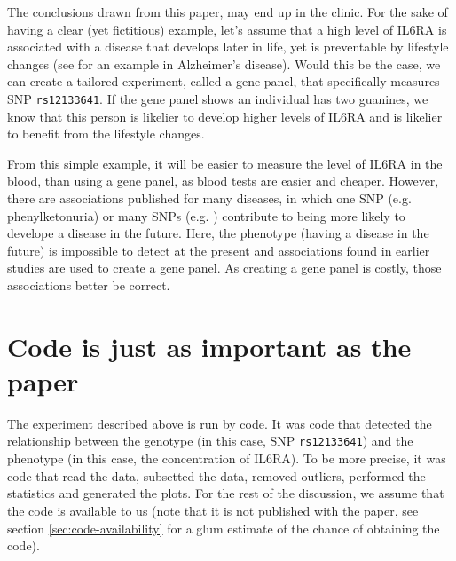 The conclusions drawn from this paper,
may end up in the clinic.
For the sake of having a clear (yet fictitious) example,
let's assume that a high level of IL6RA 
is associated with a disease that develops later in life,
yet is preventable by lifestyle 
changes (see \cite{pope2003will} for an example in Alzheimer's disease).
Would this be the case, we can create a tailored 
experiment, called a gene panel, that specifically measures
SNP \verb|rs12133641|. 
If the gene panel shows an individual has two guanines, 
we know that this person is likelier to develop higher levels of
IL6RA and is likelier to benefit from the lifestyle changes.

From this simple example, it will be easier
to measure the level of IL6RA in the blood, than using a gene panel,
as blood tests are easier and cheaper.
However, there are associations published for many diseases,
in which one SNP (e.g. phenylketonuria) or many SNPs (e.g. \cite{bruce2009metabolic}) 
contribute to being more likely to develope a disease in the future. 
Here, the phenotype (having a disease in the future) 
is impossible to detect at the present
and associations found in earlier studies are used to create a gene panel.
As creating a gene panel is costly, those associations better be correct.

\section{Code is just as important as the paper}


The experiment described above is run by code. 
It was code that detected the relationship between the genotype
(in this case, SNP \verb|rs12133641|) 
and the phenotype (in this case, the concentration of IL6RA).
To be more precise, it was code that read the data,
subsetted the data, removed outliers, 
performed the statistics and generated the plots.
For the rest of the discussion, we assume that the
code is available to us (note that it is not
published with the paper, see section \ref{sec:code-availability} 
for a glum estimate of the chance of obtaining the code).

